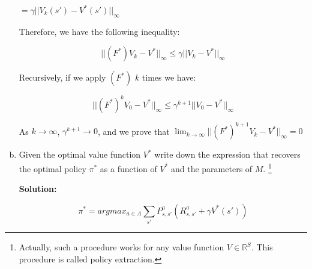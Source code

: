\documentclass[12pt]{article}
\begin{document}
\begin{enumerate}[a)]
$= \gamma ||V_k (s')- V^* ( s') ||_{\infty}$

Therefore, we have the following inequality:

\begin{equation}
  ||(F^*) V_k - V^*||_{\infty} \leqslant \gamma ||V_k - V^*||_{\infty}
\end{equation}

Recursively, if we apply $(F^*)$ $k$ times we have:

\begin{equation}
  ||(F^*)^k V_0 - V^*||_{\infty} \leqslant \gamma^{k+1} ||V_0 - V^*||_{\infty}
\end{equation}

As $k \to \infty$, $\gamma^{k+1} \to 0$, and we prove that $\lim_{k \to \infty} ||(F^*)^{k+1}V_{k}-V^*||_{\infty} = 0$

  \item Given the optimal value function $V ^*$ 
    write down the expression that recovers the optimal policy $\pi ^*$ as a 
    function of $V ^*$ and the parameters of $M$.
    \footnote{Actually, such a procedure works for any value function $V \in \mathbb R ^S$. 
    This procedure is called policy extraction.}

    \textbf{Solution:}

\begin{equation}
  \pi^*= argmax_{a \in A} \sum_{s'} P^a_{s,s'} (R^a_{s,s'} + \gamma V^*(s'))
\end{equation}
    
\end{enumerate}

\end{document}
